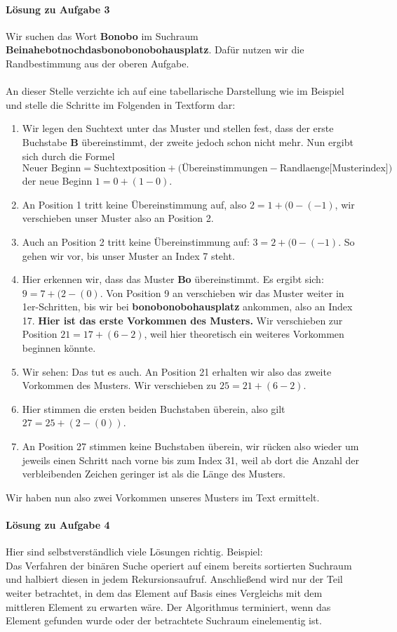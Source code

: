 \documentclass[11pt,a4paper]{scrartcl}
\begin{document}
\paragraph{Lösung zu Aufgabe 3}
\label{a2.3:lsg}
Wir suchen das Wort \textbf{Bonobo} im Suchraum \textbf{Beinahebotnochdasbonobonobohausplatz}. Dafür nutzen wir die Randbestimmung aus der oberen Aufgabe. \\\\ An dieser Stelle verzichte ich auf eine tabellarische Darstellung wie im Beispiel und stelle die Schritte im Folgenden in Textform dar:
\begin{enumerate}
\item Wir legen den Suchtext unter das Muster und stellen fest, dass der erste Buchstabe \textbf{B} übereinstimmt, der zweite jedoch schon nicht mehr. Nun ergibt sich durch die Formel
\[\text{Neuer Beginn} = \text{Suchtextposition} + (\text{Übereinstimmungen} - \text{Randlaenge[Musterindex])}\] der neue Beginn $1 = 0 + (1 - 0)$.
\item An Position 1 tritt keine Übereinstimmung auf, also $2 = 1 + (0 - (-1)$, wir verschieben unser Muster also an Position 2.
\item Auch an Position 2 tritt keine Übereinstimmung auf: $3 = 2 + (0 - (-1)$. So gehen wir vor, bis unser Muster an Index 7 steht.
\item Hier erkennen wir, dass das Muster \textbf{Bo} übereinstimmt. Es ergibt sich: $9 = 7 + (2 - (0)$. Von Position 9 an verschieben wir das Muster weiter in 1er-Schritten, bis wir bei \textbf{bonobonobohausplatz} ankommen, also an Index 17. \textbf{Hier ist das erste Vorkommen des Musters.} Wir verschieben zur Position $21 = 17 + (6 - 2)$, weil hier theoretisch ein weiteres Vorkommen beginnen könnte. 
\item Wir sehen: Das tut es auch. An Position 21 erhalten wir also das zweite Vorkommen des Musters. Wir verschieben zu $25 = 21 + (6 - 2)$.
\item Hier stimmen die ersten beiden Buchstaben überein, also gilt $27 = 25 + (2 - (0))$.
\item An Position 27 stimmen keine Buchstaben überein, wir rücken also wieder um jeweils einen Schritt nach vorne bis zum Index 31, weil ab dort die Anzahl der verbleibenden Zeichen geringer ist als die Länge des Musters.
\end{enumerate}
Wir haben nun also zwei Vorkommen unseres Musters im Text ermittelt.
\paragraph{Lösung zu Aufgabe 4}
\label{a2.4:lsg}
Hier sind selbstverständlich viele Lösungen richtig. Beispiel: \\
Das Verfahren der binären Suche operiert auf einem bereits sortierten Suchraum und halbiert diesen in jedem Rekursionsaufruf. Anschließend wird nur der Teil weiter betrachtet, in dem das Element auf Basis eines Vergleichs mit dem mittleren Element zu erwarten wäre. Der Algorithmus terminiert, wenn das Element gefunden wurde oder der betrachtete Suchraum einelementig ist.
\end{document}
